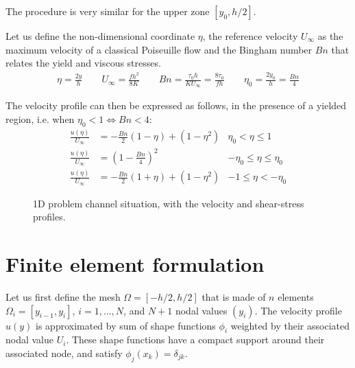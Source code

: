 \documentclass[11 pt]{report}
\begin{document}
The procedure is very similar for the upper zone $[y_0, h/2]$.

Let us define the non-dimensional coordinate $\eta$, the reference velocity $U_{\infty}$ as the maximum velocity of a classical Poiseuille flow and the Bingham number $Bn$ that relates the yield and viscous stresses.
\begin{align}
    \eta=\frac{2y}{h} \qquad U_{\infty}= \frac{f h^2}{8K} \qquad Bn=\frac{\tau_0 h}{K U_{\infty}}=\frac{8\tau_0}{f h} \qquad \eta_0 = \frac{2y_0}{h} = \frac{Bn}{4}
\end{align}

The velocity profile can then be expressed as follows, in the presence of a yielded region, i.e. when $\eta_0 < 1 \iff Bn < 4$:
\begin{align}
    \frac{u(\eta)}{U_{\infty}} &= -\frac{Bn}{2}(1-\eta) + (1-\eta^2) & \eta_0 < \eta \leq 1\\
    \frac{u(\eta)}{U_{\infty}} &= \left(1 - \frac{Bn}{4} \right)^2 & -\eta_0 \leq \eta \leq \eta_0 \\
    \frac{u(\eta)}{U_{\infty}} &= -\frac{Bn}{2}(1+\eta) + (1-\eta^2) & -1 \leq \eta < -\eta_0
\end{align}

\begin{figure}
    \centering
    \begin{subfigure}[b]{0.41\textwidth}
        
        \vspace{15pt}
    \end{subfigure}
    \begin{subfigure}[b]{0.58\textwidth}
        
    \end{subfigure}
    \caption{1D problem channel situation, with the velocity and shear-stress profiles.} \label{fig:1D_situation}
\end{figure}


\section{Finite element formulation}

Let us first define the mesh $\Omega=[-h/2, h/2]$ that is made of $n$ elements $\Omega_i=[y_{i-1}, y_i]$, $i=1, \dots, N$, and $N+1$ nodal values $(y_i)$. The velocity profile $u(y)$ is approximated by sum of shape functions $\phi_i$ weighted by their associated nodal value $U_i$. These shape functions have a compact support around their associated node, and satisfy $\phi_j(x_k) = \delta_{jk}$.
\end{document}
